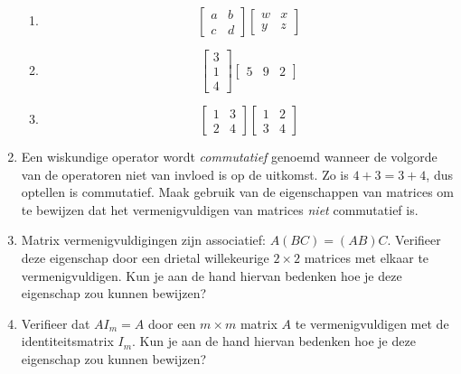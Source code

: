 \begin{enumerate}
\begin{multicols}{2}
\begin{enumerate}
  \item  
  \[
  \begin{bmatrix}a&b\\c&d\end{bmatrix}
  \begin{bmatrix}w&x\\y&z\end{bmatrix}  
  \] 
  
  
  \item  
  \[
  \begin{bmatrix}3\\1\\4\end{bmatrix}
  \begin{bmatrix}5&9&2\end{bmatrix}  
  \] 
   
   
  \item
  \[
  \begin{bmatrix}1&3\\2&4\end{bmatrix}
  \begin{bmatrix}1&2\\3&4\end{bmatrix}
  \]
  
  \end{enumerate}
  \end{multicols}
  
  

\item
Een wiskundige operator wordt \textit{commutatief} genoemd wanneer de volgorde van de operatoren niet van invloed is op de uitkomst. Zo is $4+3 = 3+4$, dus optellen is commutatief. Maak gebruik van de eigenschappen van matrices om te bewijzen dat het vermenigvuldigen van matrices \textit{niet} commutatief is.

\item
Matrix vermenigvuldigingen zijn associatief: $A(BC) = (AB)C$. Verifieer deze eigenschap door een drietal willekeurige $2 \times 2$ matrices met elkaar te vermenigvuldigen. Kun je aan de hand hiervan bedenken hoe je deze eigenschap zou kunnen bewijzen?

\item
Verifieer dat $AI_m=A$ door een $m \times m$ matrix $A$ te vermenigvuldigen met de identiteitsmatrix $I_m$. Kun je aan de hand hiervan bedenken hoe je deze eigenschap zou kunnen bewijzen?

\end{enumerate}